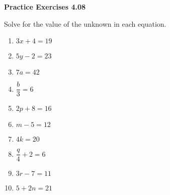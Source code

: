 \vspace{0.3ex}
\noindent\textbf{Practice Exercises 4.08}

\vspace{0.2ex}

Solve for the value of the unknown in each equation.
\begin{multicols}{2}
\begin{enumerate}
    \item \(3x + 4 = 19\)  
    \item \(5y - 2 = 23\)  
    \item \(7a = 42\)  
    \item \(\dfrac{b}{3} = 6\)  
    \item \(2p + 8 = 16\)  
    \item \(m - 5 = 12\)  
    \item \(4k = 20\)  
    \item \(\dfrac{q}{4} + 2 = 6\)  
    \item \(3r - 7 = 11\)  
    \item \(5 + 2n = 21\)  
\end{enumerate}
\end{multicols}
